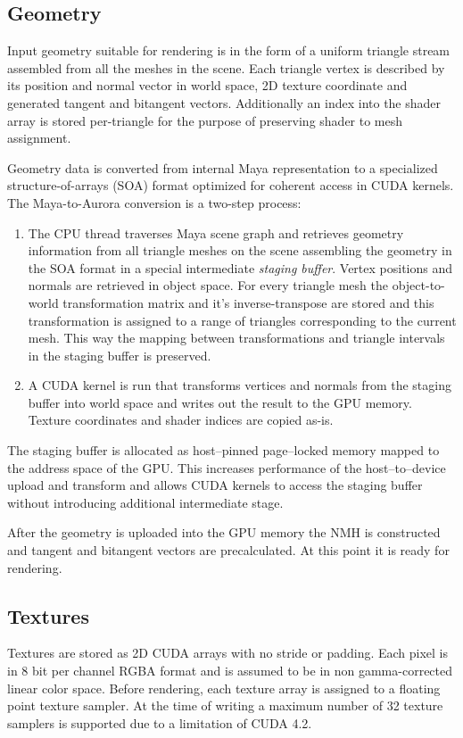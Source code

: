 \subsection{Geometry}
Input geometry suitable for rendering is in the form of a uniform triangle stream assembled from all the meshes in the scene. Each triangle vertex is described by its position and normal vector in world space, 2D texture coordinate and generated tangent and bitangent vectors. Additionally an index into the shader array is stored per-triangle for the purpose of preserving shader to mesh assignment.

Geometry data is converted from internal Maya representation to a specialized structure-of-arrays (SOA) format optimized for coherent access in CUDA kernels. The Maya-to-Aurora conversion is a two-step process:
\begin{enumerate}
\item The CPU thread traverses Maya scene graph and retrieves geometry information from all triangle meshes on the scene assembling the geometry in the SOA format in a special intermediate \emph{staging buffer}. Vertex positions and normals are retrieved in object space. For every triangle mesh the object-to-world transformation matrix and it's inverse-transpose are stored and this transformation is assigned to a range of triangles corresponding to the current mesh. This way the mapping between transformations and triangle intervals in the staging buffer is preserved.
\item A CUDA kernel is run that transforms vertices and normals from the staging buffer into world space and writes out the result to the GPU memory. Texture coordinates and shader indices are copied as-is.
\end{enumerate}
The staging buffer is allocated as host--pinned page--locked memory mapped to the address space of the GPU. This increases performance of the host--to--device upload and transform and allows CUDA kernels to access the staging buffer without introducing additional intermediate stage.

After the geometry is uploaded into the GPU memory the NMH is constructed and tangent and bitangent vectors are precalculated. At this point it is ready for rendering.

\subsection{Textures}
Textures are stored as 2D CUDA arrays with no stride or padding. Each pixel is in 8 bit per channel RGBA format and is assumed to be in non gamma-corrected linear color space. Before rendering, each texture array is assigned to a floating point texture sampler. At the time of writing a maximum number of 32 texture samplers is supported due to a limitation of CUDA 4.2.

